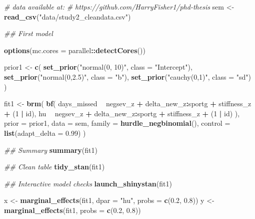 \documentclass[
  english,
  man,floatsintext]{apa6}
\newenvironment{Shaded}{\begin{snugshade}}{\end{snugshade}}
\newcommand{\CommentTok}[1]{\textcolor[rgb]{0.56,0.35,0.01}{\textit{#1}}}
\newcommand{\DataTypeTok}[1]{\textcolor[rgb]{0.13,0.29,0.53}{#1}}
\newcommand{\DecValTok}[1]{\textcolor[rgb]{0.00,0.00,0.81}{#1}}
\newcommand{\FloatTok}[1]{\textcolor[rgb]{0.00,0.00,0.81}{#1}}
\newcommand{\KeywordTok}[1]{\textcolor[rgb]{0.13,0.29,0.53}{\textbf{#1}}}
\newcommand{\NormalTok}[1]{#1}
\newcommand{\OperatorTok}[1]{\textcolor[rgb]{0.81,0.36,0.00}{\textbf{#1}}}
\newcommand{\StringTok}[1]{\textcolor[rgb]{0.31,0.60,0.02}{#1}}
\begin{document}
\begin{Shaded}
\begin{Highlighting}[]
\CommentTok{# data available at: }
\CommentTok{# https://github.com/HarryFisher1/phd-thesis}
\NormalTok{sem <-}\StringTok{ }\KeywordTok{read_csv}\NormalTok{(}\StringTok{"data/study2_cleandata.csv"}\NormalTok{) }

\CommentTok{## First model}

\KeywordTok{options}\NormalTok{(}\DataTypeTok{mc.cores =}\NormalTok{ parallel}\OperatorTok{::}\KeywordTok{detectCores}\NormalTok{())}

\NormalTok{prior1 <-}\StringTok{ }\KeywordTok{c}\NormalTok{(}
  \KeywordTok{set_prior}\NormalTok{(}\StringTok{"normal(0, 10)"}\NormalTok{, }\DataTypeTok{class =} \StringTok{"Intercept"}\NormalTok{),}
  \KeywordTok{set_prior}\NormalTok{(}\StringTok{"normal(0,2.5)"}\NormalTok{, }\DataTypeTok{class =} \StringTok{"b"}\NormalTok{),}
  \KeywordTok{set_prior}\NormalTok{(}\StringTok{"cauchy(0,1)"}\NormalTok{, }\DataTypeTok{class =} \StringTok{"sd"}\NormalTok{)}
\NormalTok{)}

\NormalTok{fit1 <-}\StringTok{ }\KeywordTok{brm}\NormalTok{(}
  \KeywordTok{bf}\NormalTok{(}
\NormalTok{    days_missed }\OperatorTok{~}\StringTok{ }\NormalTok{negsev_z }\OperatorTok{+}\StringTok{ }\NormalTok{delta_new_z}\OperatorTok{:}\NormalTok{sportg }\OperatorTok{+}\StringTok{ }\NormalTok{stiffness_z }\OperatorTok{+}\StringTok{ }\NormalTok{(}\DecValTok{1} \OperatorTok{|}\StringTok{ }\NormalTok{id),}
\NormalTok{    hu }\OperatorTok{~}\StringTok{ }\NormalTok{negsev_z }\OperatorTok{+}\StringTok{ }\NormalTok{delta_new_z}\OperatorTok{:}\NormalTok{sportg }\OperatorTok{+}\StringTok{ }\NormalTok{stiffness_z }\OperatorTok{+}\StringTok{ }\NormalTok{(}\DecValTok{1} \OperatorTok{|}\StringTok{ }\NormalTok{id)}
\NormalTok{  ),}
  \DataTypeTok{prior =}\NormalTok{ prior1,}
  \DataTypeTok{data =}\NormalTok{ sem,}
  \DataTypeTok{family =} \KeywordTok{hurdle_negbinomial}\NormalTok{(),}
  \DataTypeTok{control =} \KeywordTok{list}\NormalTok{(}\DataTypeTok{adapt_delta =} \FloatTok{0.99}\NormalTok{)}
\NormalTok{)}

\CommentTok{## Summary}
\KeywordTok{summary}\NormalTok{(fit1)}

\CommentTok{## Clean table}
\KeywordTok{tidy_stan}\NormalTok{(fit1)}

\CommentTok{## Interactive model checks}
\KeywordTok{launch_shinystan}\NormalTok{(fit1)}

\NormalTok{x <-}\StringTok{ }\KeywordTok{marginal_effects}\NormalTok{(fit1, }\DataTypeTok{dpar =} \StringTok{"hu"}\NormalTok{, }\DataTypeTok{probs =} \KeywordTok{c}\NormalTok{(}\FloatTok{0.2}\NormalTok{, }\FloatTok{0.8}\NormalTok{))}
\NormalTok{y <-}\StringTok{ }\KeywordTok{marginal_effects}\NormalTok{(fit1, }\DataTypeTok{probs =} \KeywordTok{c}\NormalTok{(}\FloatTok{0.2}\NormalTok{, }\FloatTok{0.8}\NormalTok{))}


\end{Highlighting}
\end{Shaded}
\end{document}
